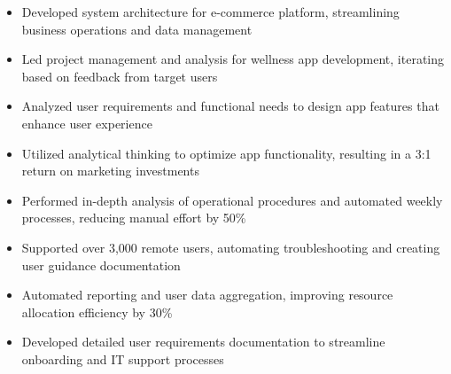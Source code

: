 \par\smallskip
\noindent
\begin{minipage}{20cm}
  \begin{minipage}{9.75cm}
    \begin{itemize}
      \item Developed system architecture for e-commerce platform, streamlining business operations and data management
      \item Led project management and analysis for wellness app development, iterating based on feedback from target users
    \end{itemize}
  \end{minipage}
  \hfill
  \begin{minipage}{9.75cm}
    \begin{itemize}
      \item Analyzed user requirements and functional needs to design app features that enhance user experience
      \item Utilized analytical thinking to optimize app functionality, resulting in a 3:1 return on marketing investments
    \end{itemize}
  \end{minipage}
\end{minipage}
\par\smallskip
\divider

\par\smallskip
\noindent
\begin{minipage}{20cm}
  \begin{minipage}{9.75cm}
    \begin{itemize}
      \item Performed in-depth analysis of operational procedures and automated weekly processes, reducing manual effort by 50\%
      \item Supported over 3,000 remote users, automating troubleshooting and creating user guidance documentation
    \end{itemize}
  \end{minipage}
  \hfill
  \begin{minipage}{9.75cm}
    \begin{itemize}
      \item Automated reporting and user data aggregation, improving resource allocation efficiency by 30\%
      \item Developed detailed user requirements documentation to streamline onboarding and IT support processes
    \end{itemize}
  \end{minipage}
\end{minipage}

